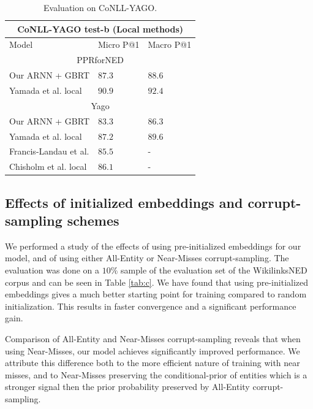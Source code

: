 \documentclass[11pt]{article}
\begin{document}
\begin{table}[h]
	\begin{center}
		\begin{tabular}{|p{3.5cm}| p{1.5cm} p{1.5cm}|}
			\hline \multicolumn{3}{|c|}{CoNLL-YAGO test-b (Local methods)} \\
			\hline Model & Micro P@1 & Macro P@1 \\ 
			\hline \multicolumn{3}{|c|}{PPRforNED} \\
			\hline Our ARNN + GBRT    & $87.3$  & $88.6$ \\
			Yamada et al. local               & $90.9$  & $92.4$ \\
			\hline \multicolumn{3}{|c|}{Yago} \\
			\hline Our ARNN + GBRT    & $83.3$  & $86.3$ \\
			Yamada et al. local               & $87.2$  & $89.6$ \\
			Francis-Landau et al.             & $85.5$  & - \\
			Chisholm et al. local             & $86.1$  & - \\
			\hline
		\end{tabular}
	\end{center}
	\caption{\label{tab:conll} Evaluation on CoNLL-YAGO.}
\end{table}

\subsection{Effects of initialized embeddings and corrupt-sampling schemes}

We performed a study of the effects of using pre-initialized embeddings for our model, and of using either All-Entity or Near-Misses corrupt-sampling. The evaluation was done on a $10\%$ sample of the evaluation set of the WikilinksNED corpus and can be seen in Table \ref{tab:c}. We have found that using pre-initialized embeddings gives a much better starting point for training compared to random initialization. This results in faster convergence and a significant performance gain.

Comparison of All-Entity and Near-Misses corrupt-sampling reveals that when using Near-Misses, our model achieves significantly improved performance. We attribute this difference both to the more efficient nature of training with near misses, and to Near-Misses preserving the conditional-prior of entities which is a stronger signal then the prior probability preserved by All-Entity corrupt-sampling.
\end{document}

